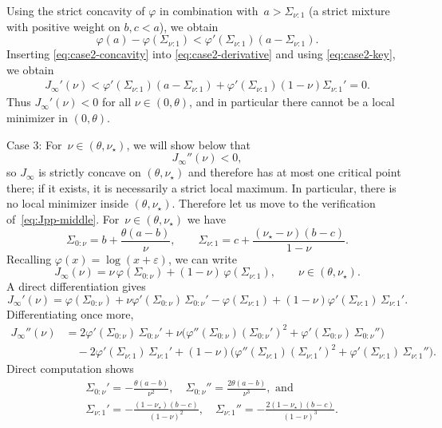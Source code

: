 \documentclass[10pt, letterpaper]{amsart}
\begin{document}
Using the strict concavity of $\varphi$ in combination with~$a> \Sigma_{\nu:1}$
(a strict mixture with positive weight on $b,c<a$), we obtain
\begin{equation}
\label{eq:case2-concavity}
\varphi(a)-\varphi(\Sigma_{\nu:1})<\varphi'(\Sigma_{\nu:1})(a-\Sigma_{\nu:1}).
\end{equation}
Inserting \eqref{eq:case2-concavity} into \eqref{eq:case2-derivative} and using
\eqref{eq:case2-key}, we obtain
\begin{align}
J_\infty'(\nu)
< \varphi'(\Sigma_{\nu:1})(a-\Sigma_{\nu:1}) +\varphi'(\Sigma_{\nu:1})(1-\nu) \Sigma_{\nu:1}' =0.
\end{align}
Thus $J_\infty'(\nu)<0$ for all $\nu\in(0,\theta)$, and in particular there
cannot be a local minimizer in $(0,\theta)$. \smallskip

Case 3: For~$\nu \in (\theta, \nu_\star)$, we will show below that
\begin{equation}\label{eq:Jpp-middle}
J_\infty''(\nu)<0,
\end{equation}
so $J_\infty$ is strictly concave on $(\theta,\nu_\star)$ and therefore
has at most one critical point there; if it exists, it is necessarily a strict local maximum. In particular, there is no local minimizer inside $(\theta,\nu_\star)$. Therefore let us move to the verification of~\eqref{eq:Jpp-middle}. For~$\nu \in (\theta, \nu_\star)$
we have
\[
\Sigma_{0:\nu}
= b+\frac{\theta(a-b)}{\nu},
\qquad
\Sigma_{\nu:1}
= c+\frac{(\nu_\star-\nu)(b-c)}{1-\nu}.
\]
Recalling $\varphi(x)=\log(x+\varepsilon)$, we can write
\[
J_\infty(\nu)=\nu\,\varphi(\Sigma_{0:\nu})+(1-\nu)\,\varphi(\Sigma_{\nu:1}),
\qquad \nu\in(\theta,\nu_\star).
\]
A direct differentiation gives
\[
J_\infty'(\nu)
=\varphi(\Sigma_{0:\nu})+\nu \varphi'(\Sigma_{0:\nu})\,\Sigma_{0:\nu}'
-\varphi(\Sigma_{\nu:1})+(1-\nu)\varphi'(\Sigma_{\nu:1})\,\Sigma_{\nu:1}'.
\]
Differentiating once more,
\begin{align*}
J_\infty''(\nu)
&= 2\varphi'(\Sigma_{0:\nu})\,\Sigma_{0:\nu}'
   +\nu\Big(\varphi''(\Sigma_{0:\nu})(\Sigma_{0:\nu}')^2+\varphi'(\Sigma_{0:\nu})\,\Sigma_{0:\nu}''\Big) \\
&\quad -2\varphi'(\Sigma_{\nu:1})\,\Sigma_{\nu:1}'
   +(1-\nu)\Big(\varphi''(\Sigma_{\nu:1})(\Sigma_{\nu:1}')^2+\varphi'(\Sigma_{\nu:1})\,\Sigma_{\nu:1}''\Big).
\end{align*}
Direct computation shows
\begin{align}
& \Sigma_{0:\nu}'= -\frac{\theta(a-b)}{\nu^2},\quad     
\Sigma_{0:\nu}''= \frac{2\theta(a-b)}{\nu^3}, \mbox{ and} \\
& \Sigma_{\nu:1}'= -\frac{(1-\nu_\star)(b-c)}{(1-\nu)^2},\quad
\Sigma_{\nu:1}''= -\frac{2(1-\nu_\star)(b-c)}{(1-\nu)^3}.
\end{align}
\end{document}

